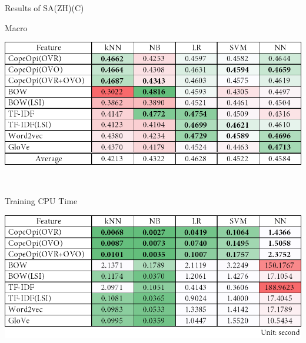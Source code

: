 \begin{table}[H]
\caption{Results of SA(ZH)(C)}
\label{tab:sa_zh_c}
\centering
\begin{subtable}{\textwidth}
	\centering
	\caption{Macro \fscore{}}
	\includegraphics[width=\resultfigwidth]{chapters/ch4/table/sa/SA(ZH)(C).png}
\end{subtable}
\\[\tblskip]
\begin{subtable}{\textwidth}
	\centering
	\caption{Training CPU Time}
	\includegraphics[width=\resultfigwidth]{chapters/ch4/table/sa/SA(ZH)(C)T.png}
\end{subtable}
\end{table}
